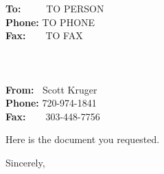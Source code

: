\documentclass{letter}
\begin{document}
      \address{
      \large \bf
				FAX MESSAGE \\
      \large \bf
	 2 PAGES INCLUDING COVER
	}
      
  \begin{letter}
	{
      \large
	 {\bf To:\ \ \ \ } TO PERSON \\
	 {\bf Phone:}  TO PHONE\\
	 {\bf Fax:\ \ \ } TO FAX
	  \ \\
	  \ \\
	  \ \\
	  \ \\
	 {\bf From:\ } Scott Kruger\\
	 {\bf Phone:} 720-974-1841\\
	 {\bf Fax:\ \ \ } 303-448-7756 \\
	} 

      \normalsize
      
      \opening{}
      
		Here is the document you requested.
      
      
      \signature{Scott Kruger\\
      	 Research Scientist}
      
      \closing{Sincerely,}
      
      
  \end{letter}
\end{document}
